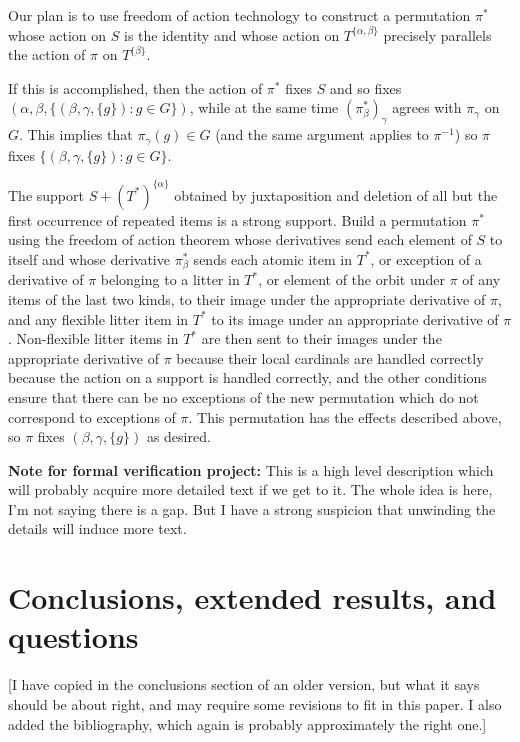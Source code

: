 \documentclass[112pt]{article}
\begin{document}
Our plan is to use freedom of action technology to construct a permutation $\pi^*$ whose action on $S$ is the identity
and whose action on $T^{\{\alpha,\beta\}}$ precisely parallels the action of $\pi$ on $T^{\{\beta\}}$.

If this is accomplished, then the action of $\pi^*$ fixes $S$ and so fixes $(\alpha,\beta,\{(\beta,\gamma,\{g\}):g \in G\})$, while at the same
time $(\pi^*_\beta)_\gamma$ agrees with $\pi_\gamma$ on $G$.  This implies that $\pi_\gamma(g) \in G$ (and the same argument applies to $\pi^{-1}$)
so $\pi$ fixes $\{(\beta,\gamma,\{g\}):g \in G\}$.

The support $S+(T^*)^{\{\alpha\}}$ obtained by juxtaposition and deletion of all but the first occurrence of repeated items is a strong support.  Build a permutation $\pi^*$ using the freedom of action theorem whose derivatives
send each element of $S$ to itself and whose derivative $\pi^*_\beta$ sends each atomic item in $T^*$, or exception of a derivative of $\pi$ belonging to a litter in $T^*$, or element of the orbit under $\pi$ of any items of the last two kinds, to their image under the appropriate derivative of $\pi$, and any flexible litter item in $T^*$ to its image under an appropriate derivative of $\pi$.  Non-flexible litter items in $T^*$ are then sent to their images under the appropriate derivative of $\pi$ because their local cardinals are handled correctly because the action on a support is handled correctly, and the other conditions ensure that there can be no exceptions of the new permutation which do not correspond to exceptions of $\pi$.  This permutation has the effects described above, so $\pi$ fixes $(\beta,\gamma,\{g\})$ as desired.



{\bf Note for formal verification project:}  This is a high level description which will probably acquire more detailed text if we get to it.  The whole idea is here, I'm not saying there is a gap.  But I have a strong suspicion that unwinding the details will induce more text.

\newpage

\section{Conclusions, extended results, and questions}
[I have copied in the conclusions section of an older version, but what it says should be about right, 
and may require some revisions to fit in this paper.  I also added the bibliography, which again is probably approximately the right one.]
\end{document}
